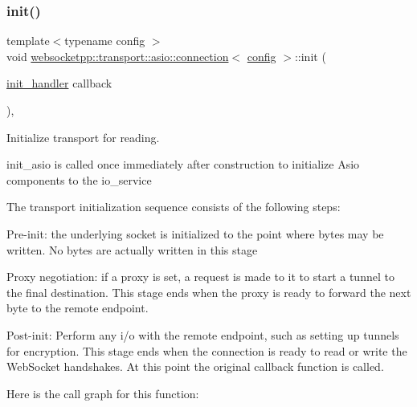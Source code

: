 \subsubsection{\texorpdfstring{init()}{init()}}
{\footnotesize\ttfamily template$<$typename config $>$ \\
void \mbox{\hyperlink{classwebsocketpp_1_1transport_1_1asio_1_1connection}{websocketpp\+::transport\+::asio\+::connection}}$<$ \mbox{\hyperlink{classconfig}{config}} $>$\+::init (\begin{DoxyParamCaption}\item[{\mbox{\hyperlink{namespacewebsocketpp_1_1transport_aeae75e675c1a334b3b33ab7120b480a5}{init\+\_\+handler}}}]{callback }\end{DoxyParamCaption})\hspace{0.3cm}{\ttfamily [inline]}, {\ttfamily [protected]}}



Initialize transport for reading. 

init\+\_\+asio is called once immediately after construction to initialize Asio components to the io\+\_\+service

The transport initialization sequence consists of the following steps\+:
\begin{DoxyItemize}
\item Pre-\/init\+: the underlying socket is initialized to the point where bytes may be written. No bytes are actually written in this stage
\item Proxy negotiation\+: if a proxy is set, a request is made to it to start a tunnel to the final destination. This stage ends when the proxy is ready to forward the next byte to the remote endpoint.
\item Post-\/init\+: Perform any i/o with the remote endpoint, such as setting up tunnels for encryption. This stage ends when the connection is ready to read or write the Web\+Socket handshakes. At this point the original callback function is called. 
\end{DoxyItemize}Here is the call graph for this function\+:
\mbox{\label{classwebsocketpp_1_1transport_1_1asio_1_1connection_a6432e2cbcb4e7781a6910dd7c9aa05e6}} 
